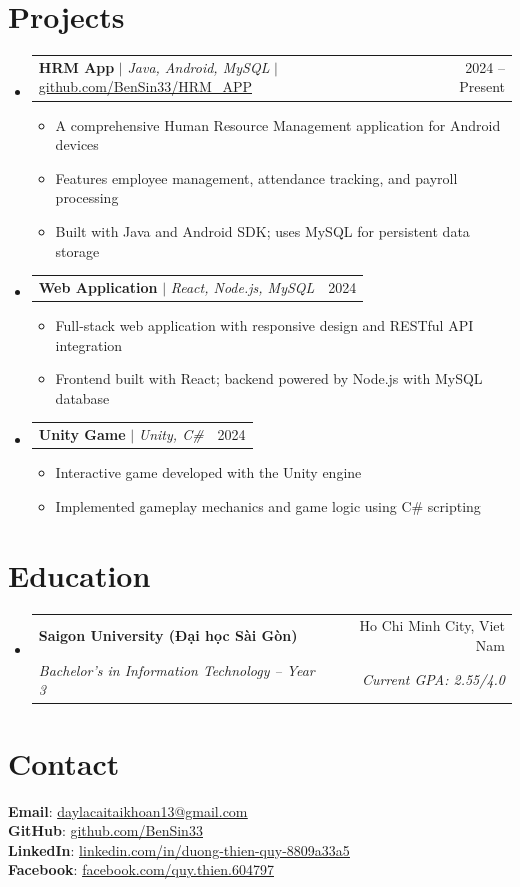 \documentclass[letterpaper,11pt]{article}
\makeatletter
\newcommand{\resumeItem}[1]{
  \item\small{
    {#1 \vspace{-2pt}}
  }
}
\newcommand{\resumeSubheading}[4]{
  \vspace{-2pt}\item
    \begin{tabular*}{0.97\textwidth}[t]{l@{\extracolsep{\fill}}r}
      \textbf{#1} & #2 \\
      \textit{\small#3} & \textit{\small #4} \\
    \end{tabular*}\vspace{-7pt}
}
\newcommand{\resumeProjectHeading}[2]{
    \item
    \begin{tabular*}{0.97\textwidth}{l@{\extracolsep{\fill}}r}
      \small#1 & #2 \\
    \end{tabular*}\vspace{-7pt}
}
\newcommand{\resumeSubHeadingListStart}{\begin{itemize}[leftmargin=0.15in, label={}]}
\newcommand{\resumeSubHeadingListEnd}{\end{itemize}}
\newcommand{\resumeItemListStart}{\begin{itemize}}
\newcommand{\resumeItemListEnd}{\end{itemize}\vspace{-5pt}}
\makeatother
\begin{document}
\section{Projects}
    \resumeSubHeadingListStart

        \resumeProjectHeading
        {\textbf{HRM App} $|$ \footnotesize\emph{Java, Android, MySQL} $|$
        \href{https://github.com/BenSin33/HRM_APP}{\underline{github.com/BenSin33/HRM\_APP}}}{2024 -- Present}
        \resumeItemListStart
            \resumeItem{A comprehensive Human Resource Management application for Android devices}
            \resumeItem{Features employee management, attendance tracking, and payroll processing}
            \resumeItem{Built with Java and Android SDK; uses MySQL for persistent data storage}
        \resumeItemListEnd

        \resumeProjectHeading
        {\textbf{Web Application} $|$ \footnotesize\emph{React, Node.js, MySQL}}{2024}
        \resumeItemListStart
            \resumeItem{Full-stack web application with responsive design and RESTful API integration}
            \resumeItem{Frontend built with React; backend powered by Node.js with MySQL database}
        \resumeItemListEnd

        \resumeProjectHeading
        {\textbf{Unity Game} $|$ \footnotesize\emph{Unity, C\#}}{2024}
        \resumeItemListStart
            \resumeItem{Interactive game developed with the Unity engine}
            \resumeItem{Implemented gameplay mechanics and game logic using C\# scripting}
        \resumeItemListEnd

    \resumeSubHeadingListEnd

\section{Education}
  \resumeSubHeadingListStart

    \resumeSubheading
      {Saigon University (Đại học Sài Gòn)}{Ho Chi Minh City, Viet Nam}
      {Bachelor's in Information Technology -- Year 3}{Current GPA: 2.55/4.0}

  \resumeSubHeadingListEnd

\section{Contact}
 \begin{itemize}[leftmargin=0.15in, label={}]
    \small{\item{
     \textbf{Email}{: \href{mailto:daylacaitaikhoan13@gmail.com}{\underline{daylacaitaikhoan13@gmail.com}}} \\
     \textbf{GitHub}{: \href{https://github.com/BenSin33}{\underline{github.com/BenSin33}}} \\
     \textbf{LinkedIn}{: \href{https://www.linkedin.com/in/duong-thien-quy-8809a33a5/}{\underline{linkedin.com/in/duong-thien-quy-8809a33a5}}} \\
     \textbf{Facebook}{: \href{https://www.facebook.com/quy.thien.604797}{\underline{facebook.com/quy.thien.604797}}}
    }}
 \end{itemize}
\end{document}
